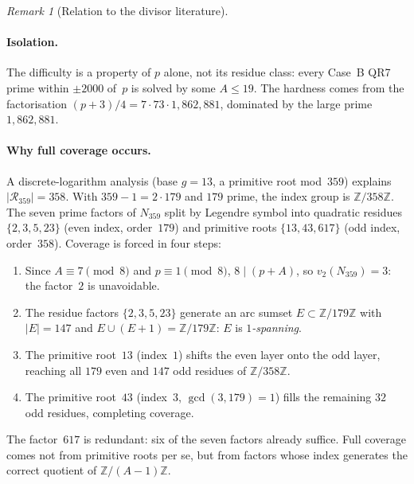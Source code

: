 \documentclass[12pt]{amsart}
\theoremstyle{definition}
\theoremstyle{remark}
\newtheorem{remark}[theorem]{Remark}
\begin{document}
\begin{remark}[Relation to the divisor literature]
\paragraph{Isolation.}
The difficulty is a property of $p$ alone, not its residue class: every Case~B
QR7 prime within $\pm 2000$ of~$p$ is solved by some $A \leq 19$. The hardness
comes from the factorisation $(p+3)/4 = 7 \cdot 73 \cdot 1{,}862{,}881$,
dominated by the large prime~$1{,}862{,}881$.

\paragraph{Why full coverage occurs.}
A discrete-logarithm analysis (base $g = 13$, a primitive root mod~$359$)
explains $|\mathcal{R}_{359}| = 358$. With $359 - 1 = 2 \cdot 179$ and $179$
prime, the index group is $\mathbb{Z}/358\mathbb{Z}$. The seven prime factors
of $N_{359}$ split by Legendre symbol into quadratic residues $\{2, 3, 5, 23\}$
(even index, order~$179$) and primitive roots $\{13, 43, 617\}$ (odd index,
order~$358$). Coverage is forced in four steps:
\begin{enumerate}
  \item Since $A \equiv 7 \pmod 8$ and $p \equiv 1 \pmod 8$, $8 \mid (p+A)$, so
    $v_2(N_{359}) = 3$: the factor~$2$ is unavoidable.
  \item The residue factors $\{2,3,5,23\}$ generate an arc sumset
    $E \subset \mathbb{Z}/179\mathbb{Z}$ with $|E| = 147$ and
    $E \cup (E+1) = \mathbb{Z}/179\mathbb{Z}$: $E$ is \emph{$1$-spanning}.
  \item The primitive root~$13$ (index~$1$) shifts the even layer onto the odd
    layer, reaching all $179$ even and $147$ odd residues of
    $\mathbb{Z}/358\mathbb{Z}$.
  \item The primitive root~$43$ (index~$3$, $\gcd(3,179)=1$) fills the
    remaining $32$ odd residues, completing coverage.
\end{enumerate}
The factor~$617$ is redundant: six of the seven factors already suffice. Full
coverage comes not from primitive roots per se, but from factors whose index
generates the correct quotient of $\mathbb{Z}/(A-1)\mathbb{Z}$.


\end{remark}
\end{document}
